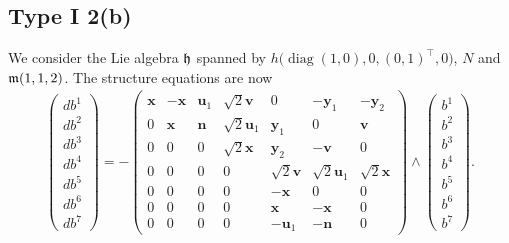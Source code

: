 \documentclass[pdftex]{sigma}
\numberwithin{equation}{section}
\newcommand\fh{{\frak h}}
\newcommand\fm{{\frak m}}
\newcommand\bx{{\mathbf x}}
\newcommand\bu{{\mathbf u}}
\newcommand\by{{\mathbf y}}
\newcommand\bn{{\mathbf n}}
\newcommand\bv{{\mathbf v}}
\newcommand{\diag}{\operatorname{diag}}
\begin{document}
\subsection{Type I 2(b)}
We consider the Lie algebra $\fh$ spanned by $h\big(\diag(1,0),0,(0,1)^\top,0\big)$, $N$ and $\fm(1,1,2)$.
The structure equations are now
\begin{gather}\label{EI2(b)}\left(\begin{matrix} db^1\\db^2\\db^3\\db^4\\db^5\\db^6\\db^7\end{matrix}\right) = -\left(
\begin{matrix}
{\bx} &-\bx&\bu_1&\sqrt2 \bv&0&-\by_1&-\by_2\\
0&\bx&\bn&\sqrt2 \bu_1&\by_1&0&\bv\\
0&0&0&\sqrt 2 \bx&\by_2&-\bv&0\\
0&0&0&0&\sqrt2\bv&\sqrt2 \bu_1&\sqrt 2 \bx\\
0&0&0&0&-\bx&0&0\\
0&0&0&0&\bx&-\bx&0\\
0&0&0&0&-\bu_1&-\bn&0
\end{matrix}\right) \wedge \left(\begin{matrix} b^1\\b^2\\b^3\\b^4\\b^5\\b^6\\b^7\end{matrix}\right).
\end{gather}
\end{document}
